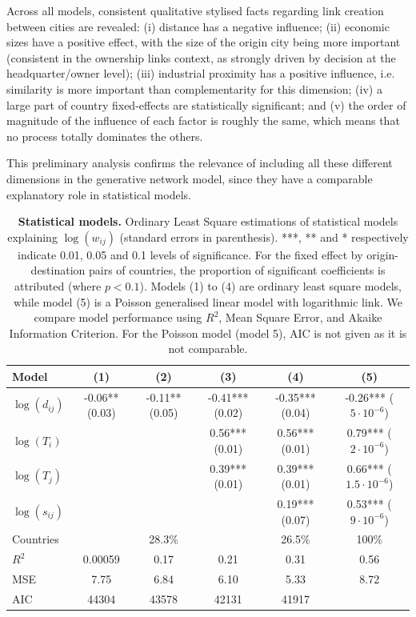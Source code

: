 \documentclass[10pt,letterpaper]{article}
\begin{document}
Across all models, consistent qualitative stylised facts regarding link creation between cities are revealed: (i) distance has a negative influence; (ii) economic sizes have a positive effect, with the size of the origin city being more important (consistent in the ownership links context, as strongly driven by decision at the headquarter/owner level); (iii) industrial proximity has a positive influence, i.e. similarity is more important than complementarity for this dimension; (iv) a large part of country fixed-effects are statistically significant; and (v) the order of magnitude of the influence of each factor is roughly the same, which means that no process totally dominates the others.

This preliminary analysis confirms the relevance of including all these different dimensions in the generative network model, since they have a comparable explanatory role in statistical models.


\begin{table}[!ht]
\begin{adjustwidth}{-1in}{0in}
\caption{{\bf Statistical models.} Ordinary Least Square estimations of statistical models explaining $\log(w_{ij})$ (standard errors in parenthesis). ***, ** and * respectively indicate 0.01, 0.05 and 0.1 levels of significance. For the fixed effect by origin-destination pairs of countries, the proportion of significant coefficients is attributed (where $p<0.1$). Models (1) to (4) are ordinary least square models, while model (5) is a Poisson generalised linear model with logarithmic link. We compare model performance using $R^2$, Mean Square Error, and Akaike Information Criterion. For the Poisson model (model 5), AIC is not given as it is not comparable. \label{tab:reg}}
\medskip
\begin{tabular}{|l|c|c|c|c|c|}
\hline
Model  & (1) & (2) & (3) & (4) & (5) \\ 
\hline
$\log(d_{ij})$ &      -0.06** (0.03) &   -0.11** (0.05)  & -0.41*** (0.02)  & -0.35*** (0.04)  &  -0.26*** ($5\cdot 10^{-6}$) \\
$\log(T_i)$ &   &   & 0.56*** (0.01) &  0.56*** (0.01) & 0.79*** ($2\cdot 10^{-6}$) \\
$\log(T_j)$ &     &   & 0.39*** (0.01) &  0.39*** (0.01) & 0.66***  ($1.5\cdot 10^{-6}$) \\
$\log(s_{ij})$ &     &   &  &  0.19*** (0.07) & 0.53*** ($9\cdot 10^{-6}$)  \\
Countries &    &  28.3\% &   &  26.5\% & 100\% \\
\hline
$R^2$ &       0.00059   &  0.17 & 0.21 &  0.31  &  0.56 \\
MSE & 7.75 & 6.84 & 6.10 & 5.33 & 8.72 \\
AIC &        44304   &  43578  &  42131  & 41917 &   \\
\hline
\end{tabular}
\end{adjustwidth}
\end{table}
\end{document}
